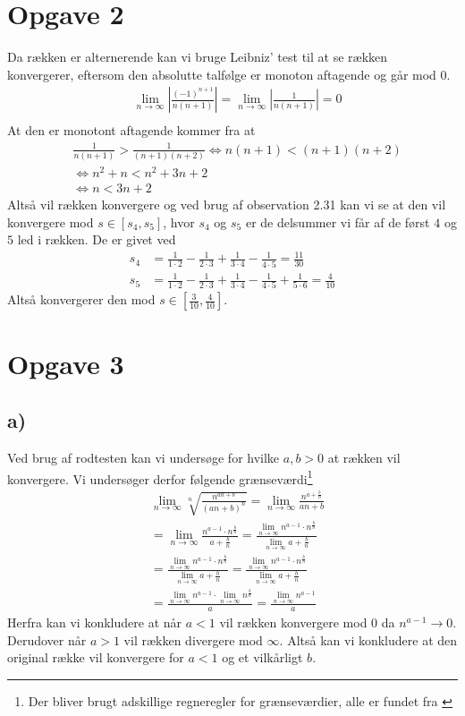 \documentclass{article}
\newcommand{\abs}[1]{\left| #1\right|}
\begin{document}
\section*{Opgave 2}
Da rækken er alternerende kan vi bruge Leibniz' test \cite[sætning 2.30]{an1} til at se
rækken konvergerer, eftersom den absolutte talfølge er monoton aftagende og går mod 0.
\begin{align*}
&\lim_{n \to \infty}\abs{\frac{(-1)^{n+1}}{n(n+1)}} = \lim_{n \to \infty} \abs{\frac{1}{n(n+1)}} = 0 \\
\end{align*}
At den er monotont aftagende kommer fra at
\begin{align*}
    &\frac{1}{n(n+1)} > \frac{1}{(n+1)(n+2)} \iff n(n+1) < (n+1)(n+2) \\
    &\iff n^2 + n < n^2 + 3n + 2 \\
    &\iff n < 3n + 2
\end{align*}
Altså vil rækken konvergere og ved brug af observation 2.31\cite{an1} kan vi se at
den vil konvergere mod $s \in [s_4, s_5]$, hvor $s_4$ og $s_5$ er de delsummer vi får
af de først $4$ og $5$ led i rækken. De er givet ved
\begin{align*}
    s_4 &= \frac{1}{1\cdot2} - \frac{1}{2\cdot3} + \frac{1}{3\cdot4} - \frac{1}{4\cdot5} = \frac{11}{30} \\
    s_5 &= \frac{1}{1\cdot2} - \frac{1}{2\cdot3} + \frac{1}{3\cdot4} - \frac{1}{4\cdot5} + \frac{1}{5\cdot6} = \frac{4}{10}
\end{align*}
Altså konvergerer den mod $s \in [\frac{3}{10}, \frac{4}{10}]$.

\section*{Opgave 3}
\subsection*{a)}
Ved brug af rodtesten \cite[sætning 2.26]{an1} kan vi undersøge for hvilke $a,b > 0$ at rækken vil konvergere.
Vi undersøger derfor følgende grænseværdi\footnote{Der bliver brugt adskillige regneregler for grænseværdier, alle er fundet fra \cite[kapitel 2.4]{an0}}
\begin{align*}
    &\lim_{n \to \infty} \sqrt[n]{\frac{n^{an+b}}{(an+b)^n}}
    =\lim_{n \to \infty} \frac{n^{a+\frac{b}{n}}}{an+b} \\
    &=\lim_{n \to \infty} \frac{n^{a-1}\cdot n^{\frac{b}{n}}}{a+\frac{b}{n}}
    =\frac{\lim_{n \to \infty} n^{a-1}\cdot n^{\frac{b}{n}}}{\lim_{n \to \infty} a+\frac{b}{n}} \\
    &=\frac{\lim_{n \to \infty} n^{a-1}\cdot n^{\frac{b}{n}}}{\lim_{n \to \infty} a+\frac{b}{n}}
    =\frac{\lim_{n \to \infty} n^{a-1}\cdot n^{\frac{b}{n}}}{\lim_{n \to \infty} a+\frac{b}{n}} \\
    &=\frac{\lim_{n \to \infty} n^{a-1}\cdot \lim_{n \to \infty}n^{\frac{b}{n}}}{a}
    =\frac{\lim_{n \to \infty} n^{a-1}}{a}
\end{align*}
Herfra kan vi konkludere at når $a < 1$ vil rækken konvergere mod $0$ da $n^{a-1} \to 0$.
Derudover når $a > 1$ vil rækken divergere mod $\infty$. Altså kan vi konkludere at den original række
vil konvergere for $a < 1$ og et vilkårligt $b$.
\end{document}

